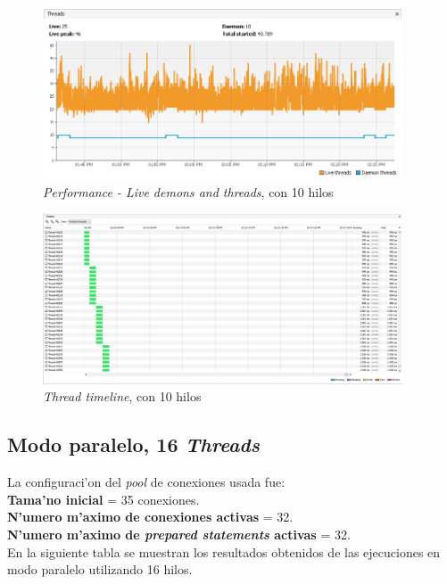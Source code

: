 \begin{figure}[H]
\centering
\includegraphics[width=0.95\textwidth]{images/Performance_LIVE_10_Threads}
\caption{\emph{Performance - Live demons and threads}, con 10 hilos}
\label{fig:6.21}
\end{figure}

\begin{figure}[H]
\centering
\includegraphics[width=0.95\textwidth]{images/Running_Time_10_Threads}
\caption{\emph{Thread timeline}, con 10 hilos}
\label{fig:6.22}
\end{figure}

\subsection{Modo paralelo, 16 \emph{Threads}}
\noindent
La configuraci'on del \emph{pool} de conexiones usada fue: \\

\textbf{Tama'no inicial} = 35 conexiones. \\
\textbf{N'umero m'aximo de conexiones activas} = 32. \\
\textbf{N'umero m'aximo de \emph{prepared statements} activas} = 32. \\

En la siguiente tabla se muestran los resultados obtenidos de las ejecuciones en modo paralelo utilizando 16 hilos. \\


